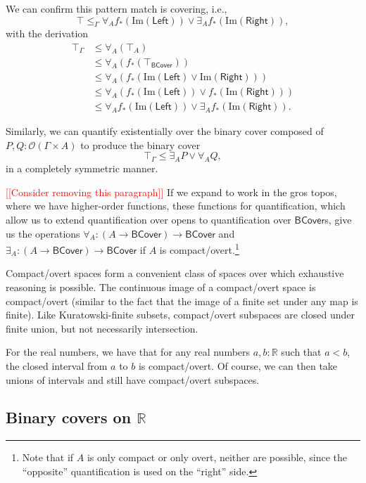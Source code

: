 \documentclass[conference]{IEEEtran}
\newcommand{\R}{\mathbb{R}}
\newcommand{\Open}[1]{\mathcal{O}({#1})}
\newcommand{\Img}[1]{\text{Im}\left({#1}\right)}
\newcommand{\note}[1]{\textcolor{red}{[[{#1}]]}}
\begin{document}
We can confirm this pattern match is covering, i.e.,
\[
\top \le_\Gamma \forall_A f_*(\Img{\mathsf{Left}}) \vee \exists_A f_*(\Img{\mathsf{Right}}),
\]
with the derivation
\begin{align*}
\top_\Gamma 
  &\le \forall_A (\top_A) \tag{$\forall_A$ adjointness}
\\ &\le \forall_A (f_*(\top_\mathsf{BCover})) \tag{$f_*$ preserves $\top$}
\\ &\le \forall_A (f_*(\Img{\mathsf{Left}} \vee \Img{\mathsf{Right}}))
\\ &\le \forall_A(f_*(\Img{\mathsf{Left}}) \vee f_*(\Img{\mathsf{Right}}))  \tag{$f_*$ preserves joins}
\\ &\le \forall_A f_*(\Img{\mathsf{Left}}) \vee \exists_A f_*(\Img{\mathsf{Right}}) \tag{$A$ is compact/overt}.
\end{align*}

Similarly, we can quantify existentially over the binary cover composed of $P, Q : \Open{\Gamma \times A}$ to produce the binary cover
\[
\top_\Gamma \le \exists_A P \vee \forall_A Q,
\]
in a completely symmetric manner.

\note{Consider removing this paragraph} If we expand to work in the gros topos, where we have higher-order functions, these functions for quantification, which allow us to extend quantification over opens to quantification over $\mathsf{BCover}$s, give us the operations $\forall_A : (A \to \mathsf{BCover}) \to \mathsf{BCover}$ and $\exists_A : (A \to \mathsf{BCover}) \to \mathsf{BCover}$ if $A$ is compact/overt.\footnote{Note that if $A$ is only compact or only overt, neither are possible, since the ``opposite'' quantification is used on the ``right'' side.}

Compact/overt spaces form a convenient class of spaces over which exhaustive reasoning is possible. The continuous image of a compact/overt space is compact/overt (similar to the fact that the image of a finite set under any map is finite). Like Kuratowski-finite subsets, compact/overt subspaces are closed under finite union, but not necessarily intersection.

For the real numbers, we have that for any real numbers $a, b : \R$ such that $a < b$, the closed interval from $a$ to $b$ is compact/overt. Of course, we can then take unions of intervals and still have compact/overt subspaces.

\subsection{Binary covers on $\R$}
\end{document}
